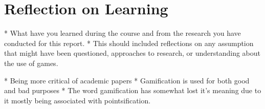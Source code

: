 \section{Reflection on Learning}
* What have you learned during the course and from the research you have conducted for this report.
* This should included reflections on any assumption that might have been questioned, approaches to research, or understanding about the use of games.

* Being more critical of academic papers
* Gamification is used for both good and bad purposes
* The word gamification has somewhat lost it's meaning due to it mostly being associated with pointsification. 